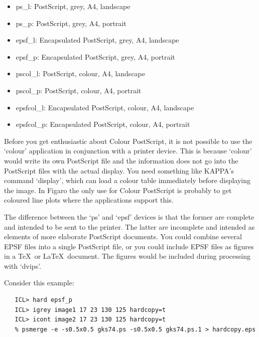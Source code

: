 \begin{itemize}
\item   ps\_l: PostScript, grey, A4, landscape
\item   ps\_p: PostScript, grey, A4, portrait
\item   epsf\_l: Encapsulated PostScript, grey, A4, landscape
\item   epsf\_p: Encapsulated PostScript, grey, A4, portrait
\item   pscol\_l: PostScript, colour, A4, landscape
\item   pscol\_p: PostScript, colour, A4, portrait
\item   epsfcol\_l: Encapsulated PostScript, colour, A4, landscape
\item   epsfcol\_p: Encapsulated PostScript, colour, A4, portrait
\end{itemize}

   Before you get enthusiastic about Colour PostScript, it is not
   possible to use the `colour' application in conjunction with a
   printer device. This is because `colour' would write its own
   PostScript file and the information does not go into the PostScript
   files with the actual display. You need something like KAPPA's
   command `display', which can load a colour table immediately before
   displaying the image. In Figaro the only use for Colour PostScript is
   probably to get coloured line plots where the applications support
   this.

   The difference between the `ps' and `epsf' devices is that the former
   are complete and intended to be sent to the printer. The latter are
   incomplete and intended as elements of more elaborate PostScript
   documents. You could combine several EPSF files into a single
   PostScript file, or you could include EPSF files as figures in a
   \TeX\ or \LaTeX\ document. The figures would be included during
   processing with `dvips'.

   Consider this example:

\begin{verbatim}
   ICL> hard epsf_p
   ICL> igrey image1 17 23 130 125 hardcopy=t
   ICL> icont image2 17 23 130 125 hardcopy=t
   % psmerge -e -s0.5x0.5 gks74.ps -s0.5x0.5 gks74.ps.1 > hardcopy.eps
\end{verbatim}

